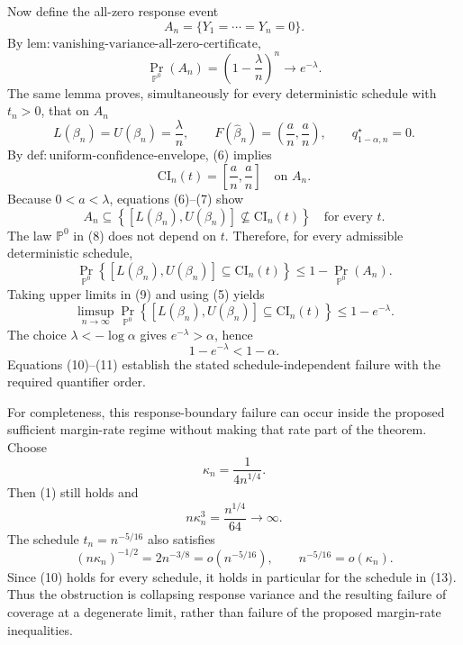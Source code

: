 Now define the all-zero response event
\[
A_n=\{Y_1=\cdots=Y_n=0\}.
\]
By \(\mathrm{lem:vanishing\text{-}variance\text{-}all\text{-}zero\text{-}certificate}\),
\[
\Pr_{\mathbb P^0}(A_n)=\left(1-\frac{\lambda}{n}\right)^n
\longrightarrow e^{-\lambda}.
\tag{5}
\]
The same lemma proves, simultaneously for every deterministic schedule with \(t_n>0\), that on \(A_n\)
\[
L(\beta_n)=U(\beta_n)=\frac{\lambda}{n},
\qquad
F(\widehat\beta_n)=\left(\frac an,\frac an\right),
\qquad
q_{1-\alpha,n}^{\star}=0.
\tag{6}
\]
By \(\mathrm{def:uniform\text{-}confidence\text{-}envelope}\), (6) implies
\[
\mathrm{CI}_n(t)=\left[\frac an,\frac an\right]
\quad\text{on }A_n.
\tag{7}
\]
Because \(0<a<\lambda\), equations (6)--(7) show
\[
A_n\subseteq
\left\{[L(\beta_n),U(\beta_n)]\not\subseteq\mathrm{CI}_n(t)\right\}
\quad\text{for every }t.
\tag{8}
\]
The law \(\mathbb P^0\) in (8) does not depend on \(t\).  Therefore, for every admissible deterministic schedule,
\[
\Pr_{\mathbb P^0}\!\left\{
[L(\beta_n),U(\beta_n)]\subseteq\mathrm{CI}_n(t)
\right\}
\leq1-\Pr_{\mathbb P^0}(A_n).
\tag{9}
\]
Taking upper limits in (9) and using (5) yields
\[
\limsup_{n\to\infty}
\Pr_{\mathbb P^0}\!\left\{
[L(\beta_n),U(\beta_n)]\subseteq\mathrm{CI}_n(t)
\right\}
\leq1-e^{-\lambda}.
\tag{10}
\]
The choice \(\lambda< -\log\alpha\) gives \(e^{-\lambda}>\alpha\), hence
\[
1-e^{-\lambda}<1-\alpha.
\tag{11}
\]
Equations (10)--(11) establish the stated schedule-independent failure with the required quantifier order.

For completeness, this response-boundary failure can occur inside the proposed sufficient margin-rate regime without making that rate part of the theorem.  Choose
\[
\kappa_n=\frac{1}{4n^{1/4}}.
\]
Then (1) still holds and
\[
n\kappa_n^3=\frac{n^{1/4}}{64}\longrightarrow\infty.
\tag{12}
\]
The schedule \(t_n=n^{-5/16}\) also satisfies
\[
(n\kappa_n)^{-1/2}=2n^{-3/8}=o(n^{-5/16}),
\qquad
n^{-5/16}=o(\kappa_n).
\tag{13}
\]
Since (10) holds for every schedule, it holds in particular for the schedule in (13).  Thus the obstruction is collapsing response variance and the resulting failure of coverage at a degenerate limit, rather than failure of the proposed margin-rate inequalities.

